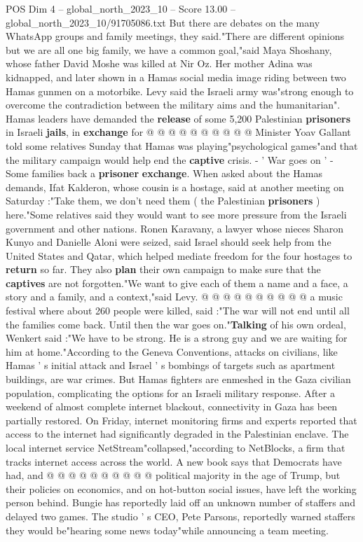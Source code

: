 \begin{textsample}{POS Dim 4 – global\_north\_2023\_10 – Score 13.00 – global\_north\_2023\_10/91705086.txt}
But there are debates on the many WhatsApp groups and family meetings, they said."There are different opinions but we are all one big family, we have a common goal,"said Maya Shoshany, whose father David Moshe was killed at Nir Oz.
Her mother Adina was kidnapped, and later shown in a Hamas social media image riding between two Hamas gunmen on a motorbike.
Levy said the Israeli army was"strong enough to overcome the contradiction between the military aims and the humanitarian".
Hamas leaders have demanded the \textbf{release} of some 5,200 Palestinian \textbf{prisoners} in Israeli \textbf{jails}, in \textbf{exchange} for @ @ @ @ @ @ @ @ @ @ Minister Yoav Gallant told some relatives Sunday that Hamas was playing"psychological games"and that the military campaign would help end the \textbf{captive} crisis. - ' War goes on ' - Some families back a \textbf{prisoner} \textbf{exchange}.
When asked about the Hamas demands, Ifat Kalderon, whose cousin is a hostage, said at another meeting on Saturday :"Take them, we don't need them ( the Palestinian \textbf{prisoners} ) here."Some relatives said they would want to see more pressure from the Israeli government and other nations.
Ronen Karavany, a lawyer whose nieces Sharon Kunyo and Danielle Aloni were seized, said Israel should seek help from the United States and Qatar, which helped mediate freedom for the four hostages to \textbf{return} so far.
They also \textbf{plan} their own campaign to make sure that the \textbf{captives} are not forgotten."We want to give each of them a name and a face, a story and a family, and a context,"said Levy. @ @ @ @ @ @ @ @ @ @ a music festival where about 260 people were killed, said :"The war will not end until all the families come back.
Until then the war goes on."\textbf{Talking} of his own ordeal, Wenkert said :"We have to be strong.
He is a strong guy and we are waiting for him at home."According to the Geneva Conventions, attacks on civilians, like Hamas ' s initial attack and Israel ' s bombings of targets such as apartment buildings, are war crimes.
But Hamas fighters are enmeshed in the Gaza civilian population, complicating the options for an Israeli military response.
After a weekend of almost complete internet blackout, connectivity in Gaza has been partially restored.
On Friday, internet monitoring firms and experts reported that access to the internet had significantly degraded in the Palestinian enclave.
The local internet service NetStream"collapsed,"according to NetBlocks, a firm that tracks internet access across the world.
A new book says that Democrats have had, and @ @ @ @ @ @ @ @ @ @ political majority in the age of Trump, but their policies on economics, and on hot-button social issues, have left the working person behind.
Bungie has reportedly laid off an unknown number of staffers and delayed two games.
The studio ' s CEO, Pete Parsons, reportedly warned staffers they would be"hearing some news today"while announcing a team meeting.

\end{textsample}
